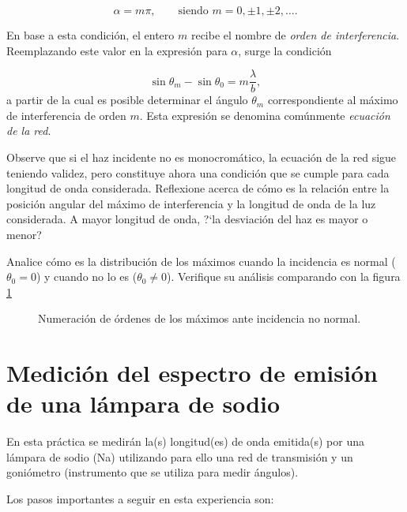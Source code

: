 \documentclass[laboratorio]{guia}
\begin{document}
\begin{equation}
    \alpha = m \pi, \quad \quad \text{siendo } m = 0, \pm 1, \pm 2, \ldots.
\end{equation}

En base a esta condici\'on, el entero $m$ recibe el nombre de {\it orden de
interferencia}. Reemplazando este valor en la expresi\'on para $\alpha$, 
surge la condici\'on

\begin{equation}
    \sin \theta_m - \sin \theta_0 = m \frac{\lambda}{b},
\end{equation}
a partir de la cual es posible determinar el \'angulo $\theta_m$ 
correspondiente al m\'aximo de interferencia de orden $m$. Esta expresi\'on
se denomina com\'unmente {\it ecuaci\'on de la red}. 

Observe que si el haz incidente no es monocrom\'atico, la ecuaci\'on de la
red sigue teniendo validez, pero constituye ahora una condici\'on que se
cumple para cada longitud de onda considerada. Reflexione acerca de c\'omo es
la relaci\'on entre la posici\'on angular del m\'aximo de interferencia y la
longitud de onda de la luz considerada. A mayor longitud de onda, ?`la 
desviaci\'on del haz es mayor o menor?

Analice c\'omo es la distribuci\'on de los m\'aximos cuando la incidencia 
es normal ($\theta_0 = 0$) y cuando no lo es ($\theta_0 \neq 0$).
Verifique su análisis comparando con la figura \ref{fig:ordenes} 

\begin{figure}
  \centering
  \def\svgwidth{\columnwidth}
  
  \caption{Numeración de órdenes de los máximos ante incidencia no normal.}
  \label{fig:ordenes}
\end{figure}



\section{Medici\'on del espectro de emisi\'on de una l\'ampara de sodio}

En esta pr\'actica se medir\'an la(s) longitud(es) de onda emitida(s) por una
l\'ampara de sodio (Na) utilizando para ello una red de transmisi\'on y un 
goni\'ometro (instrumento que se utiliza para medir \'angulos).

Los pasos importantes a seguir en esta experiencia son:
\end{document}
